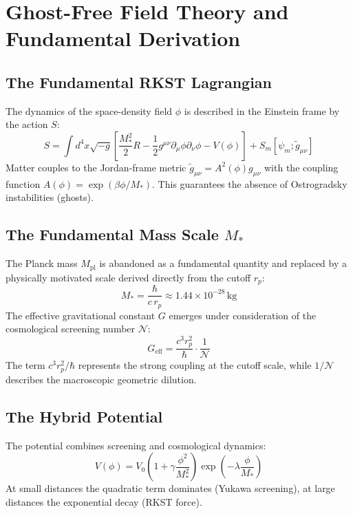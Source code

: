 \documentclass[11pt,a4paper]{article}
\begin{document}
\section{Ghost-Free Field Theory and Fundamental Derivation}
\label{sec:theory}

\subsection{The Fundamental RKST Lagrangian}
The dynamics of the space-density field $\phi$ is described in the Einstein frame by the action $S$:
\begin{equation}
S = \int d^4x \sqrt{-g} \left[ \frac{M_{*}^2}{2} R - \frac{1}{2} g^{\mu\nu} \partial_\mu \phi \partial_\nu \phi - V(\phi) \right] + S_m[\psi_m; \tilde{g}_{\mu\nu}]
\label{eq:rkst_action}
\end{equation}
Matter couples to the Jordan-frame metric $\tilde{g}_{\mu\nu} = A^2(\phi) g_{\mu\nu}$ with the coupling function $A(\phi) = \exp(\beta\phi/M_{*})$. This guarantees the absence of Ostrogradsky instabilities (ghosts).

\subsection{The Fundamental Mass Scale $M_*$}
\label{subsec:mass_scale}
The Planck mass $M_{\text{pl}}$ is abandoned as a fundamental quantity and replaced by a physically motivated scale derived directly from the cutoff $r_p$:
\begin{equation}
M_* = \frac{\hbar}{c \, r_p} \approx 1.44 \times 10^{-28} \, \text{kg}
\end{equation}
The effective gravitational constant $G$ emerges under consideration of the cosmological screening number $\mathcal{N}$:
\begin{equation}
G_{\text{eff}} = \frac{c^3 r_p^2}{\hbar} \cdot \frac{1}{\mathcal{N}}
\label{eq:G_emergence}
\end{equation}
The term $c^3 r_p^2 / \hbar$ represents the strong coupling at the cutoff scale, while $1/\mathcal{N}$ describes the macroscopic geometric dilution.

\subsection{The Hybrid Potential}
The potential combines screening and cosmological dynamics:
\begin{equation}
V(\phi) = V_0 \left( 1 + \gamma \frac{\phi^2}{M_{*}^2} \right) \exp\left(-\lambda \frac{\phi}{M_{*}}\right)
\end{equation}
At small distances the quadratic term dominates (Yukawa screening), at large distances the exponential decay (RKST force).
\end{document}
